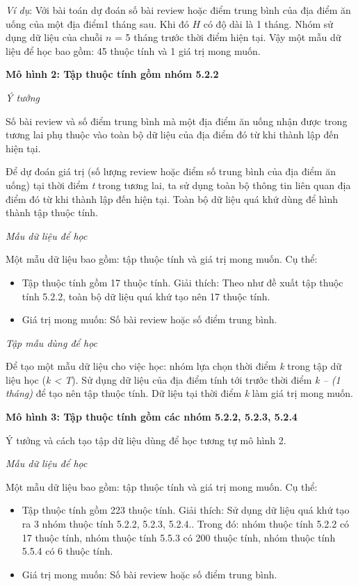 \documentclass[12pt]{extarticle}
\begin{document}
			\par \textit{Ví dụ}: Với bài toán dự đoán số bài review hoặc điểm trung bình của địa điểm ăn uống của một địa điểm1 tháng sau. Khi đó $H$ có độ dài là 1 tháng. Nhóm sử dụng dữ liệu của chuỗi $n$ = 5 tháng trước thời điểm hiện tại. Vậy một mẫu dữ liệu để học bao gồm: 45 thuộc tính và 1 giá trị mong muốn.
			\par \textbf{Mô hình 2: Tập thuộc tính gồm nhóm 5.2.2}
			\par \textit{Ý tưởng}
			\par Số bài review và số điểm trung bình mà một địa điểm ăn uống nhận được trong tương lai phụ thuộc vào toàn bộ dữ liệu của địa điểm đó từ khi thành lập đến hiện tại.
			\par Để dự đoán giá trị (số lượng review hoặc điểm số trung bình của địa điểm ăn uống) tại thời điểm \textit{t} trong tương lai, ta sử dụng toàn bộ thông tin liên quan địa điểm đó từ khi thành lập đến hiện tại. Toàn bộ dữ liệu quá khứ dùng để hình thành tập thuộc tính.
			\par \textit{Mẫu dữ liệu để học}
				\par Một mẫu dữ liệu bao gồm: tập thuộc tính và giá trị mong muốn. Cụ thể:
				\begin{itemize}
					\item Tập thuộc tính gồm 17 thuộc tính. Giải thích: Theo như đề xuất tập thuộc tính 5.2.2, toàn bộ dữ liệu quá khứ tạo nên 17 thuộc tính.  
					\item Giá trị mong muốn: Số bài review hoặc số điểm trung bình.
				\end{itemize}
			\par \textit{Tập mẫu dùng để học}
			\par  Để tạo một mẫu dữ liệu cho việc học:  nhóm lựa chọn thời điểm \textit{k} trong tập dữ liệu học (\textit{k < T}). Sử dụng dữ liệu của địa điểm tính tới trước thời điểm \textit{k – (1 tháng)} để tạo nên tập thuộc tính. Dữ liệu tại thời điểm \textit{k} làm giá trị mong muốn. 
			\par \textbf{Mô hình 3: Tập thuộc tính gồm các nhóm 5.2.2, 5.2.3, 5.2.4}
			\par Ý tưởng và cách tạo tập dữ liệu dùng để học tương tự mô hình 2.
			\par \textit{Mẫu dữ liệu để học}
			\par Một mẫu dữ liệu bao gồm: tập thuộc tính và giá trị mong muốn. Cụ thể:
				\begin{itemize}
					\item Tập thuộc tính gồm 223 thuộc tính. Giải thích: Sử dụng dữ liệu quá khứ tạo ra 3 nhóm thuộc tính 5.2.2, 5.2.3, 5.2.4.. Trong đó: nhóm thuộc tính 5.2.2 có 17 thuộc tính, nhóm thuộc tính 5.5.3 có 200 thuộc tính, nhóm thuộc tính 5.5.4 có 6 thuộc tính. 
					\item Giá trị mong muốn: Số bài review hoặc số điểm trung bình.
				\end{itemize}
\end{document}
